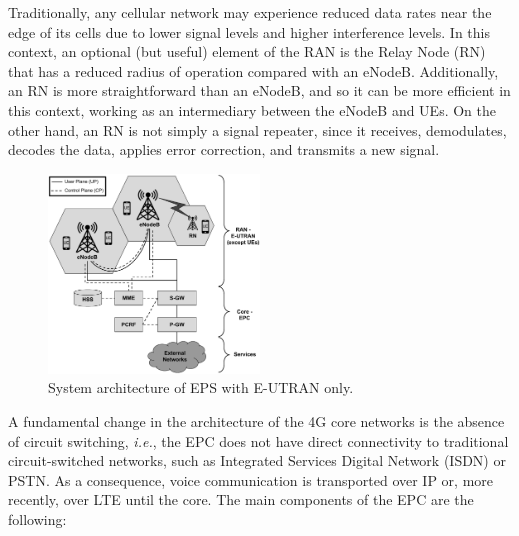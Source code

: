 Traditionally, any cellular network may experience reduced data rates near the edge of its cells due to lower signal levels and higher interference levels. In this context, an optional (but useful) element of the RAN is the Relay Node (RN) that has a reduced radius of operation compared with an eNodeB. Additionally, an RN is more straightforward than an eNodeB, and so it can be more efficient in this context, working as an intermediary between the eNodeB and UEs. On the other hand, an RN is not simply a signal repeater, since it receives, demodulates, decodes the data, applies error correction, and transmits a new signal.

\begin{figure}[htb]
 \begin{center}
\includegraphics[width=0.5\textwidth]{figs/LTE-adv.pdf}
  \end{center}
\caption{System architecture of EPS with E-UTRAN only.}
\label{fig:lte-adv}
\end{figure}

A fundamental change in the architecture of the 4G core networks is the absence of circuit switching, \textit{i.e.}, the EPC does
not have direct connectivity to traditional circuit-switched networks, such as Integrated Services Digital Network (ISDN) or PSTN. As a consequence, voice communication is transported over IP or, more recently, over LTE until the core. The main components of the EPC are the following:

